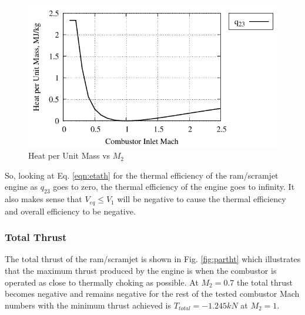 \documentclass[conf]{new-aiaa} %
\begin{document}
\begin{figure}[H] %
    \centering
    \includegraphics[]{media/performance_parameter_files/part_h_heat.pdf}
    \caption{\label{fig:parthheat}Heat per Unit Mass vs \texorpdfstring{\textit{$M_2$}}{M2}}
\end{figure}
So, looking at Eq. \ref{eqn:etath} for the thermal efficiency of the ram/scramjet engine as $q_{23}$ goes to zero, the thermal efficiency of the engine goes to infinity. It also makes sense that $V_{eq}\leq V_1$ will be negative to cause the thermal efficiency and overall efficiency to be negative.

\subsubsection{Total Thrust}
The total thrust of the ram/scramjet is shown in Fig. \ref{fig:partht} which illustrates that the maximum thrust produced by the engine is when the combustor is operated as close to thermally choking as possible. At $M_2=0.7$ the total thrust becomes negative and remains negative for the rest of the tested combustor Mach numbers with the minimum thrust achieved is $T_{total}=-1.245kN$ at $M_2=1$.
\end{document}
